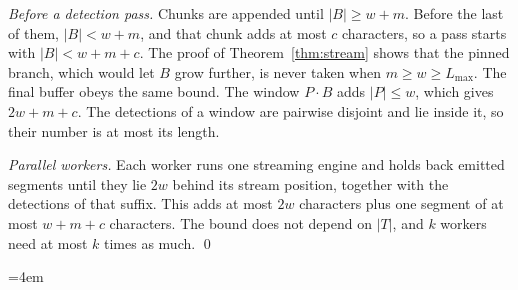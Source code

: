 \documentclass[pdflatex,sn-mathphys-num]{sn-jnl}
\theoremstyle{thmstyleone}
\theoremstyle{thmstylethree}
\begin{document}
\begin{appendices}
\emph{Before a detection pass.} Chunks are appended until $|B| \ge w + m$. Before the last of them, $|B| < w + m$, and that chunk adds at most $c$ characters, so a pass starts with $|B| < w + m + c$. The proof of Theorem~\ref{thm:stream} shows that the pinned branch, which would let $B$ grow further, is never taken when $m \ge w \ge L_{\max}$. The final buffer obeys the same bound. The window $P \cdot B$ adds $|P| \le w$, which gives $2w + m + c$. The detections of a window are pairwise disjoint and lie inside it, so their number is at most its length.

\emph{Parallel workers.} Each worker runs one streaming engine and holds back emitted segments until they lie $2w$ behind its stream position, together with the detections of that suffix. This adds at most $2w$ characters plus one segment of at most $w + m + c$ characters. The bound does not depend on $|T|$, and $k$ workers need at most $k$ times as much.
\qed

\end{appendices}

\begingroup\emergencystretch=4em

\endgroup
\end{document}
